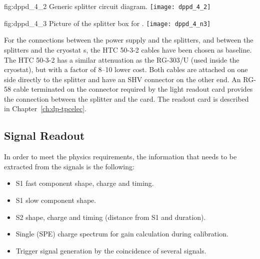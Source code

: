 \begin{dunefigure}{fig:dppd_4_2}
{Generic splitter circuit diagram.}
\texttt{[image: dppd\_4\_2]}
\end{dunefigure}

\begin{dunefigure}{fig:dppd_4_3}
{Picture of the splitter box for .}
\texttt{[image: dppd\_4\_n3]}
\end{dunefigure}

For the connections between the  power supply and the splitters, and between the splitters and the cryostat \fdth{}s, the HTC 50-3-2 cables have been chosen as baseline. The HTC 50-3-2 has a similar attenuation as the RG-303/U (used inside the cryostat), but with a factor of \numrange{8}{10} lower cost. Both cables are attached on one side directly to the  splitter and have an SHV connector on the other end. An RG-58 cable terminated on the connector required by the light readout card provides the connection between the splitter and the card. The  readout card is described in Chapter~\ref{ch:dp-tpcelec}.


\subsection{Signal Readout}
\label{sec:fddp-pd-4.3}

In order to meet the physics requirements, the information that needs to be extracted from the  signals is the following:

\begin{itemize}
\item S1 fast component shape, charge and timing.
\item S1 slow component shape.
\item S2 shape, charge and timing (distance from S1 and duration).
\item Single \phel (SPE) charge spectrum for gain calculation during  calibration.
\item Trigger signal generation by the coincidence of several  signals.
\end{itemize}

